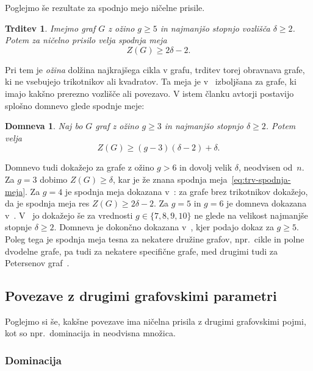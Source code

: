 \documentclass[12pt,a4paper,twoside]{article}
\theoremstyle{definition} %
\theoremstyle{plain} %
\newtheorem{trditev}[definicija]{Trditev}
\newtheorem{domneva}[definicija]{Domneva}
\numberwithin{equation}{section}  %
\begin{document}
Poglejmo še rezultate za spodnjo mejo ničelne prisile.
\begin{trditev}{{\cite[izrek 3]{davila2014bounds}}}
    Imejmo graf $G$ z ožino $g \geq 5$ in najmanjšo stopnjo vozlišča $\delta \geq 2$. Potem za ničelno prisilo velja spodnja meja
    \[ Z(G) \geq 2 \delta - 2.  \]
\end{trditev}
Pri tem je \emph{ožina} dolžina najkrajšega cikla v grafu, trditev torej obravnava grafe, ki ne vsebujejo trikotnikov ali kvadratov. Ta meja je v~\cite{davila2014bounds} izboljšana za grafe, ki imajo kakšno prerezno vozlišče ali povezavo. V istem članku avtorji postavijo splošno domnevo glede spodnje meje:
\begin{domneva}
    \label{domn:spodnja-meja}
    Naj bo $G$ graf z ožino $g \geq 3$ in najmanjšo stopnjo $\delta \geq 2$. Potem velja
    \[ Z(G) \geq (g-3)(\delta -2) + \delta. \]
\end{domneva}
Domnevo tudi dokažejo za grafe z ožino $g > 6$ in dovolj velik $\delta$, neodvisen od~$n$. Za $g=3$ dobimo $Z(G) \geq \delta$, kar je že znana spodnja meja~\eqref{eq:trv-spodnja-meja}. Za $g = 4$ je spodnja meja dokazana v~\cite{gentner2016extremal}: za grafe brez trikotnikov dokažejo, da je spodnja meja res $Z(G) \geq 2\delta - 2$. Za $g = 5$ in $g = 6$ je domneva dokazana v~\cite{gentner2018bounds}. V~\cite{davila2018forcing} jo dokažejo še za vrednosti $g \in \{7, 8, 9, 10\}$ ne glede na velikost najmanjše stopnje $\delta \geq 2$. Domneva je dokončno dokazana v~\cite{davila2018lower}, kjer podajo dokaz za $g \geq 5$. 
Poleg tega je spodnja meja tesna za nekatere družine grafov, npr.~cikle in polne dvodelne grafe, pa tudi za nekatere specifične grafe, med drugimi tudi za Petersenov graf~\cite{davila2014bounds}.


\subsection{Povezave z drugimi grafovskimi parametri}

Poglejmo si še, kakšne povezave ima ničelna prisila z drugimi grafovskimi pojmi, kot so npr.~dominacija in neodvisna množica.

\subsubsection{Dominacija}
\end{document}
